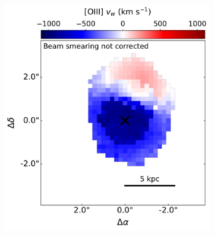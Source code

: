 \begin{figure}
\begin{subfigure}{0.43\linewidth}
    \label{fig: muse_f13451_1232: analysis_and_results: extended_emission: w80_map_nm}
    \end{subfigure}
    \caption[Beam-smearing-corrected and non-beam-smearing-corrected $W_\mathrm{80}$ velocity-width maps of the central $6\times6$\;arcsecond ($13\times13$\;kpc) region around the primary nucleus of F13451+1232.]{Non-parametric velocity width ($W_\mathrm{80}=v_\mathrm{90}-v_\mathrm{10}$) maps of the central $6\times6$\;arcsecond ($13\times13$\;kpc) region around the primary nucleus of F13451+1232 (black cross), as measured from free-fitting Gaussian components (left panel) and fitting the nuclear model and $N_\mathrm{g}$ Gaussian components (in which only the $N_\mathrm{g}$ Gaussian components were used to measure $W_\mathrm{80}$; right panel). The former case (left panel) is what would be expected had the beam smearing of compact high-velocity outflow emission not been accounted for, while the latter case (right panel) accounts for this beam smearing.}
    \label{fig: muse_f13451_1232: analysis_and_results: extended_emission: w80_maps}
    \vspace*{12pt}
    \centering
    \begin{subfigure}[b]{0.5175\linewidth}        
        \includegraphics[width=\textwidth]{figures/muse_f13451_1232/vw_map_free.pdf}

\end{subfigure}
\end{figure}
